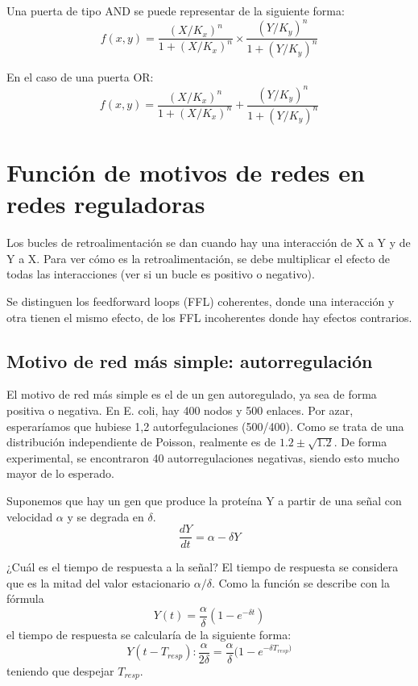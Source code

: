 Una puerta de tipo AND se puede representar de la siguiente forma:
$$f(x,y) = \frac{(X/K_x)^n}{1 + (X/K_x)^n} \times \frac{(Y/K_y)^n}{1 + (Y/K_y)^n}$$

En el caso de una puerta OR:
$$f(x,y) = \frac{(X/K_x)^n}{1 + (X/K_x)^n} + \frac{(Y/K_y)^n}{1 + (Y/K_y)^n}$$

\section{Función de motivos de redes en redes reguladoras}
Los bucles de retroalimentación se dan cuando hay una interacción de X a Y y de Y a X. Para ver cómo es la retroalimentación, se debe multiplicar el efecto de todas las interacciones (ver si un bucle es positivo o negativo).

Se distinguen los feedforward loops (FFL) coherentes, donde una interacción y otra tienen el mismo efecto, de los FFL incoherentes donde hay efectos contrarios.

\subsection{Motivo de red más simple: autorregulación}
El motivo de red más simple es el de un gen autoregulado, ya sea de forma positiva o negativa. En E. coli, hay 400 nodos y 500 enlaces. Por azar, esperaríamos que hubiese 1,2 autorfegulaciones (500/400). Como se trata de una distribución independiente de Poisson, realmente es de $1.2 \pm \sqrt{1.2}$. De forma experimental, se encontraron 40 autorregulaciones negativas, siendo esto mucho mayor de lo esperado.

Suponemos que hay un gen que produce la proteína Y a partir de una señal con velocidad $\alpha$ y se degrada en $\delta$. 
$$\frac{dY}{dt} = \alpha - \delta Y$$

¿Cuál es el tiempo de respuesta a la señal? El tiempo de respuesta se considera que es la mitad del valor estacionario $\alpha/\delta$. Como la función se describe con la fórmula
$$Y(t) = \frac{\alpha}{\delta} (1 - e^{-\delta t})$$
el tiempo de respuesta se calcularía de la siguiente forma:
$$Y(t-T_{resp}): \frac{\alpha}{2 \delta} = \frac{\alpha}{\delta} (1 - e^{-\delta T_{resp})}$$
teniendo que despejar $T_{resp}$.

